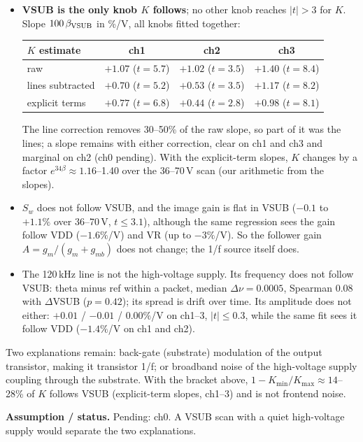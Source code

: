 \documentclass[10pt,a4paper]{article}
\newcommand{\caveat}[1]{\par\smallskip\noindent\colorbox{orange!10}{\parbox{\dimexpr\linewidth-2\fboxsep}{\small\textbf{Assumption / status.} #1}}\par\smallskip}
\begin{document}
\begin{itemize}
\item \textbf{VSUB is the only knob $K$ follows}; no other knob reaches $|t|>3$ for $K$. Slope $100\,\beta_{\rm VSUB}$
in \%/V, all knobs fitted together:
\begin{center}\small
\begin{tabular}{@{}lccc@{}}\toprule
$K$ estimate & ch1 & ch2 & ch3\\\midrule
raw & $+1.07$ ($t=5.7$) & $+1.02$ ($t=3.5$) & $+1.40$ ($t=8.4$)\\
lines subtracted & $+0.70$ ($t=5.2$) & $+0.53$ ($t=3.5$) & $+1.17$ ($t=8.2$)\\
explicit terms & $+0.77$ ($t=6.8$) & $+0.44$ ($t=2.8$) & $+0.98$ ($t=8.1$)\\\bottomrule
\end{tabular}
\end{center}
The line correction removes 30--50\% of the raw slope, so part of it was the lines; a slope remains with either
correction, clear on ch1 and ch3 and marginal on ch2 (ch0 pending). With the explicit-term slopes, $K$ changes by a
factor $e^{34\beta}\approx1.16$--1.40 over the 36--70\,V scan (our arithmetic from the slopes).
\item $S_w$ does not follow VSUB, and the image gain is flat in VSUB ($-0.1$ to $+1.1\%$ over 36--70\,V, $t\le3.1$),
although the same regression sees the gain follow VDD ($-1.6\%$/V) and VR (up to $-3\%$/V). So the follower gain
$A=g_m/(g_m+g_{mb})$ does not change; the 1/f source itself does.
\item The 120\,kHz line is not the high-voltage supply. Its frequency does not follow VSUB: theta minus ref within a
packet, median $\Delta\nu=0.0005$, Spearman \cite{spearman1904} 0.08 with $\Delta$VSUB ($p=0.42$); its spread is
drift over time. Its amplitude does not either: $+0.01$ / $-0.01$ / $0.00\%$/V on ch1--3, $|t|\le0.3$, while the same
fit sees it follow VDD ($-1.4\%$/V on ch1 and ch2).
\end{itemize}
Two explanations remain: back-gate (substrate) modulation of the output transistor, making it transistor 1/f; or
broadband noise of the high-voltage supply coupling through the substrate. With the bracket above,
$1-K_{\min}/K_{\max}\approx14$--28\% of $K$ follows VSUB (explicit-term slopes, ch1--3) and is not frontend noise.
\caveat{Pending: ch0. A VSUB scan with a quiet high-voltage supply would separate the two explanations.}
\end{document}
